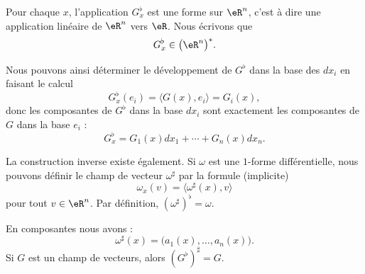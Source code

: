 Pour chaque $x$, l'application $G_x^{\flat}$ est une forme sur $\eR^n$, c'est à dire une application linéaire de $\eR^n$ vers $\eR$. Nous écrivons que
\begin{equation}
	G_x^{\flat}\in\big( \eR^n \big)^*.
\end{equation}

Nous pouvons ainsi déterminer le développement de $G^{\flat}$ dans la base des $dx_i$ en faisant le calcul
\begin{equation}
	G_x^{\flat}(e_i)=\langle G(x), e_i\rangle =G_i(x),
\end{equation}
donc les composantes de $G^{\flat}$ dans la base $dx_i$ sont exactement les composantes de $G$ dans la base $e_i$ :
\begin{equation}
	G^{\flat}_x=G_1(x)dx_1+\cdots+G_n(x)dx_n.
\end{equation}

La construction inverse existe également. Si $\omega$ est une $1$-forme différentielle, nous pouvons définir le champ de vecteur $\omega^{\sharp}$ par la formule (implicite)
\begin{equation}
	\omega_x(v)=\langle \omega^{\sharp}(x), v\rangle 
\end{equation}
pour tout $v\in\eR^n$. Par définition, $(\omega^{\sharp})^{\flat}=\omega$. 

\begin{lemma}
    En composantes nous avons :
	\begin{equation}
		\omega^{\sharp}(x)=\big( a_1(x),\ldots,a_n(x) \big).
	\end{equation}
	Si $G$ est un champ de vecteurs, alors $(G^{\flat})^{\sharp}=G$.
\end{lemma}
